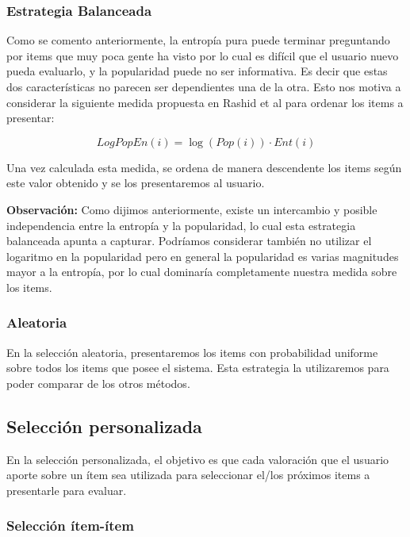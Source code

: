 \documentclass[hidelinks,12pt,a4paper]{book}
\theoremstyle{plain}
\theoremstyle{definition}
\begin{document}
\subsubsection{Estrategia Balanceada}

Como se comento anteriormente, la entropía pura puede terminar preguntando por items que muy poca gente ha visto por lo cual es difícil que el usuario nuevo pueda evaluarlo, y la popularidad puede no ser informativa. Es decir que estas dos características no parecen ser dependientes una de la otra\cite{CS:rashid2002getting}. Esto nos motiva a considerar la siguiente medida propuesta en Rashid et al\cite{CS:rashid2002getting} para ordenar los items a presentar:

\begin{equation}
\label{eq:bal}
LogPopEn(i) = \log(Pop(i))\cdot Ent(i)
\end{equation}

Una vez calculada esta medida, se ordena de manera descendente los items según este valor obtenido y se los presentaremos al usuario.

\textbf{Observación:}  Como dijimos anteriormente, existe un intercambio y posible independencia entre la entropía y la popularidad, lo cual esta estrategia balanceada apunta a capturar. Podríamos considerar también no utilizar el logaritmo en la popularidad pero en general la popularidad es varias magnitudes mayor a la entropía, por lo cual dominaría completamente nuestra medida sobre los items.

\subsubsection{Aleatoria}

En la selección aleatoria, presentaremos los items con probabilidad uniforme  sobre todos los items que posee el sistema. Esta estrategia la utilizaremos para poder comparar de los otros métodos. 

\subsection{Selección personalizada}

En la selección personalizada, el objetivo es que cada valoración que el usuario aporte sobre un ítem sea utilizada para seleccionar el/los próximos items a presentarle para evaluar. 

\subsubsection{Selección ítem-ítem}
\end{document}
